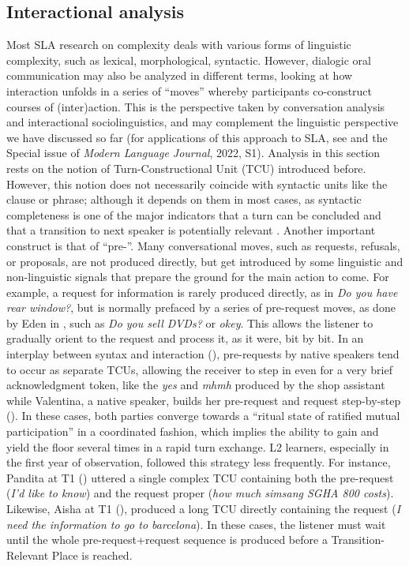 \documentclass[output=paper]{langscibook}
\begin{document}
\subsection{\label{sec:pallotti:4.3}Interactional analysis}

Most SLA research on complexity deals with various forms of linguistic complexity, such as lexical, morphological, syntactic. However, dialogic oral communication may also be analyzed in different terms, looking at how interaction unfolds in a series of “moves” whereby participants co-construct courses of (inter)action. This is the perspective taken by conversation analysis and interactional sociolinguistics, and may complement the linguistic perspective we have discussed so far (for applications of this approach to SLA, see  \citealt{PekarekDoehlerLauzon2015, PekarekDoehlerPochon-Berger2015, Véronique2017Converser, SkogmyrMarianBalaman2018} and the Special issue of \textit{Modern Language Journal}, 2022, S1). Analysis in this section rests on the notion of Turn-Constructional Unit (TCU) introduced before. However, this notion does not necessarily coincide with syntactic units like the clause or phrase; although it depends on them in most cases, as syntactic completeness is one of the major indicators that a turn can be concluded and that a transition to next speaker is potentially relevant \citep{Selting2000}. Another important construct is that of “pre-”. Many conversational moves, such as requests, refusals, or proposals, are not produced directly, but get introduced by some linguistic and non-linguistic signals that prepare the ground for the main action to come. For example, a request for information is rarely produced directly, as in \textit{Do you have rear window?}, but is normally prefaced by a series of pre-request moves, as done by Eden in , such as \textit{Do you sell DVDs?} or \textit{okey}. This allows the listener to gradually orient to the request and process it, as it were, bit by bit. In an interplay between syntax and interaction (\citealt{Couper-KuhlenSelting2017, PekarekDoehlerEskildsen2022}), pre-requests by native speakers tend to occur as separate TCUs, allowing the receiver to step in even for a very brief acknowledgment token, like the \textit{yes} and \textit{mhmh} produced by the shop assistant while Valentina, a native speaker, builds her pre-request and request step-by-step (). In these cases, both parties converge towards a “ritual state of ratified mutual participation” \citep[100]{Goffman1963} in a coordinated fashion, which implies the ability to gain and yield the floor several times in a rapid turn exchange. L2 learners, especially in the first year of observation, followed this strategy less frequently. For instance, Pandita at T1 () uttered a single complex TCU containing both the pre-request (\textit{I’d like to know}) and the request proper (\textit{how much simsang SGHA 800 costs}). Likewise, Aisha at T1 (), produced a long TCU directly containing the request (\textit{I need the information to go to barcelona}). In these cases, the listener must wait until the whole pre-request+request sequence is produced before a Transition-Relevant Place is reached.
\end{document}
